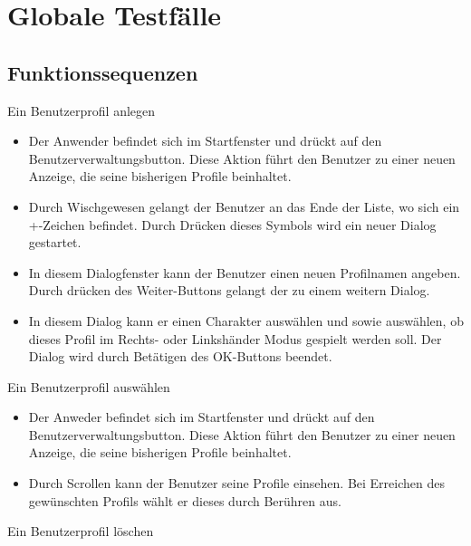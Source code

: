 \documentclass{scrartcl}
\begin{document}
\clearpage








\section{Globale Testfälle}

\subsection{Funktionssequenzen}

\begin{telist}
	\item Ein Benutzerprofil anlegen
	\begin{itemize}
		\item Der Anwender befindet sich im Startfenster und drückt auf den \glqq Benutzerverwaltungsbutton\grqq. Diese Aktion führt den Benutzer zu einer neuen Anzeige, die seine bisherigen Profile beinhaltet.
		\item Durch Wischgewesen gelangt der Benutzer an das Ende der Liste, wo sich ein \glqq +\grqq-Zeichen befindet. Durch Drücken dieses Symbols wird ein neuer Dialog gestartet.
		\item In diesem Dialogfenster kann der Benutzer einen neuen Profilnamen angeben. Durch drücken des \glqq Weiter\grqq-Buttons gelangt der zu einem weitern Dialog.
		\item In diesem Dialog kann er einen Charakter auswählen und sowie auswählen, ob dieses Profil im Rechts- oder Linkshänder Modus gespielt werden soll. Der Dialog wird durch Betätigen des \glqq OK\grqq-Buttons beendet.
	\end{itemize}
	\item Ein Benutzerprofil auswählen
	\begin{itemize}
		\item Der Anweder befindet sich im Startfenster und drückt auf den \glqq Benutzerverwaltungsbutton\grqq. Diese Aktion führt den Benutzer zu einer neuen Anzeige, die seine bisherigen Profile beinhaltet.
		\item Durch Scrollen kann der Benutzer seine Profile einsehen. Bei Erreichen des gewünschten Profils wählt er dieses durch Berühren aus.
	\end{itemize}
	\item Ein Benutzerprofil löschen

\end{telist}
\end{document}
